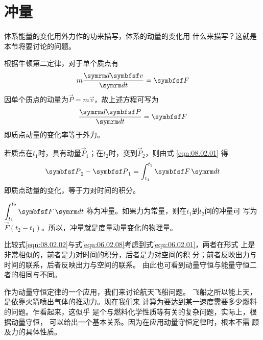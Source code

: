 \section[冲量]{冲\qquad 量}\label{sec:08.02}

体系能量的变化用外力作的功来描写，体系的动量的变化用
什么来描写？这就是本节将要讨论的问题。

根据牛顿第二定律，对于单个质点有
\begin{equation*}
    m \frac { \dif \vec{v} } { \dif t } = \vec{F}
\end{equation*}
因单个质点的动量为$  \vec{P} = m \vec{v}   $，故上述方程可写为
\begin{equation}\label{eqn:08.02.01}
    \frac { \dif \vec{P} } { \dif t } = \vec{F}
\end{equation}
即质点动量的变化率等于外力。

若质点在$  t _ { 1 }   $时，具有动量$\vec{P} _ 1$；在$ t _ { 2 } $时，变到$\vec{P} _ 2$，则由式 \eqref{eqn:08.02.01}
得
\begin{equation}\label{eqn:08.02.02}
    \vec{P} _ { 2 } - \vec{P} _ { 1 } = \int _ { t _ { 1 } } ^ { t _ { 2 } } \vec{F} \dif t
\end{equation}
即质点动量的变化，等于力对时间的积分。

$ \displaystyle \int _ { t _ { 1 } } ^ { t _ { 2 } } \vec{F} \dif t $
称为冲量。如果力为常量，则在$ t_1 $到$ t_2 $间的冲量可
写为$  \vec{F} \left( t _ { 2 } - t _ { 1 } \right) $。所以，冲量就是度量动量变化的物理量。

比较式\eqref{eqn:08.02.02}与式\eqref{eqn:06.02.08}\lhbrak 考虑到式\eqref{eqn:06.02.01}\rhbrak ，两者在形式
上是非常相似的，前者是力对时间的积分，后者是力对空间的积
分；前者反映出力与时间的联系，后者反映出力与空间的联系。
由此也可看到动量守恒与能量守恒二者的相同与不同。

作为动量守恒定律的一个应用，我们来讨论航天飞船问题。
飞船之所以能上天，是依靠火箭喷出气体的推动力。现在我们来
计算为要达到某一速度需要多少燃料的问题。乍看起来，这似乎
是个与燃料化学性质等有关的复杂问题，实际上，根据动量守恒，
可以给出一个基本关系。因为在应用动量守恒定律时，根本不需
顾及力的具体性质。
